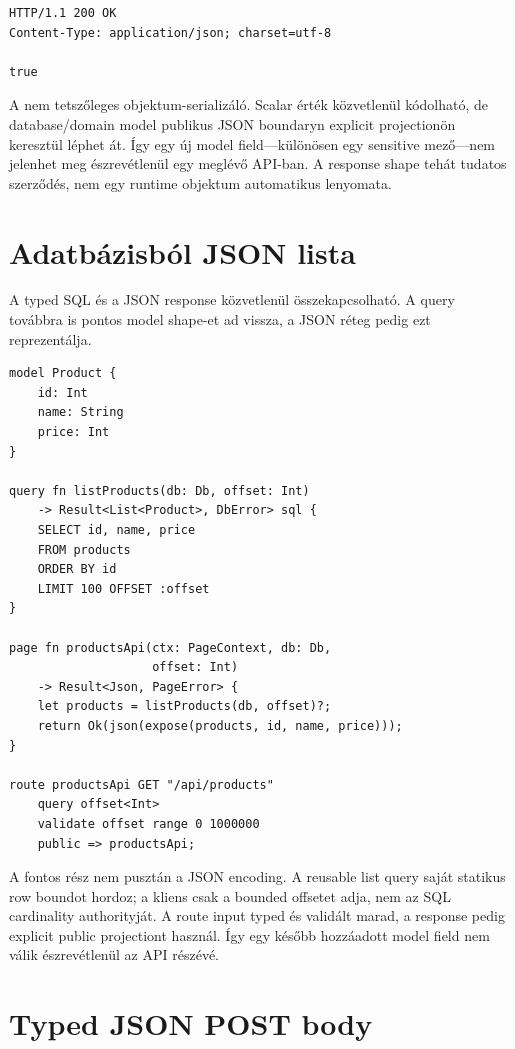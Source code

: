 \begin{lstlisting}
HTTP/1.1 200 OK
Content-Type: application/json; charset=utf-8

true
\end{lstlisting}

A  nem tetszőleges objektum-serializáló. Scalar érték közvetlenül kódolható, de database/domain model publikus JSON boundaryn explicit  projectionön keresztül léphet át. Így egy új model field---különösen egy sensitive mező---nem jelenhet meg észrevétlenül egy meglévő API-ban. A response shape tehát tudatos szerződés, nem egy runtime objektum automatikus lenyomata.

\section{Adatbázisból JSON lista}

A typed SQL és a JSON response közvetlenül összekapcsolható. A query továbbra is pontos model shape-et ad vissza, a JSON réteg pedig ezt reprezentálja.

\begin{lstlisting}[language=RWLang]
model Product {
    id: Int
    name: String
    price: Int
}

query fn listProducts(db: Db, offset: Int)
    -> Result<List<Product>, DbError> sql {
    SELECT id, name, price
    FROM products
    ORDER BY id
    LIMIT 100 OFFSET :offset
}

page fn productsApi(ctx: PageContext, db: Db,
                    offset: Int)
    -> Result<Json, PageError> {
    let products = listProducts(db, offset)?;
    return Ok(json(expose(products, id, name, price)));
}

route productsApi GET "/api/products"
    query offset<Int>
    validate offset range 0 1000000
    public => productsApi;
\end{lstlisting}

A fontos rész nem pusztán a JSON encoding. A reusable list query saját statikus row boundot hordoz; a kliens csak a bounded offsetet adja, nem az SQL cardinality authorityját. A route input typed és validált marad, a response pedig explicit public projectiont használ. Így egy később hozzáadott model field nem válik észrevétlenül az API részévé.

\section{Typed JSON POST body}

